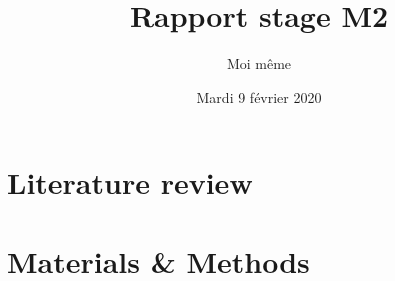 \documentclass[a4paper, 12pt, hidelinks]{article}
\title{Rapport stage M2}
\author{Moi même}
\date{Mardi 9 février 2020}
\begin{document}
\maketitle
\newpage
\tableofcontents
\newpage


\newpage
\section{Literature review}
% 


\section{Materials \& Methods}
% 






\end{document}
